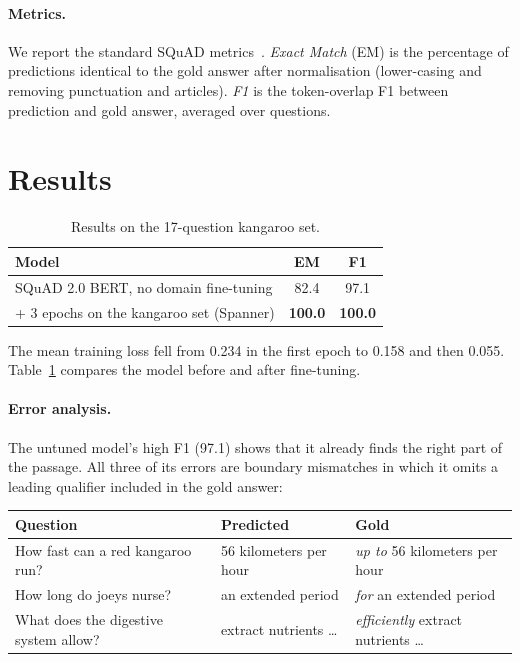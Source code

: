 \documentclass[11pt,a4paper]{article}
\begin{document}
\paragraph{Metrics.} We report the standard SQuAD metrics~\cite{rajpurkar2016squad}. \emph{Exact Match} (EM) is the percentage of predictions identical to the gold answer after normalisation (lower-casing and removing punctuation and articles). \emph{F1} is the token-overlap F1 between prediction and gold answer, averaged over questions.

\section{Results}

\begin{table}[h]
\centering
\begin{tabular}{lcc}
\toprule
Model & EM & F1 \\
\midrule
SQuAD 2.0 BERT, no domain fine-tuning & 82.4 & 97.1 \\
+ 3 epochs on the kangaroo set (Spanner) & \textbf{100.0} & \textbf{100.0} \\
\bottomrule
\end{tabular}
\caption{Results on the 17-question kangaroo set.}
\label{tab:results}
\end{table}

The mean training loss fell from 0.234 in the first epoch to 0.158 and then 0.055. Table~\ref{tab:results} compares the model before and after fine-tuning.

\paragraph{Error analysis.} The untuned model's high F1 (97.1) shows that it already finds the right part of the passage. All three of its errors are boundary mismatches in which it omits a leading qualifier included in the gold answer:

\begin{center}
\small
\begin{tabular}{lll}
\toprule
Question & Predicted & Gold \\
\midrule
How fast can a red kangaroo run? & 56 kilometers per hour & \emph{up to} 56 kilometers per hour \\
How long do joeys nurse? & an extended period & \emph{for} an extended period \\
What does the digestive system allow? & extract nutrients \dots & \emph{efficiently} extract nutrients \dots \\
\bottomrule
\end{tabular}
\end{center}
\end{document}
